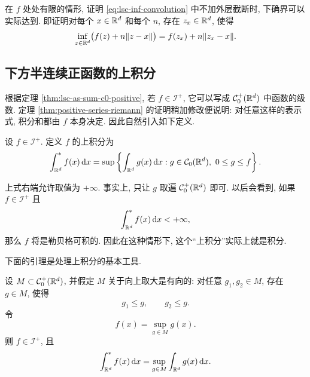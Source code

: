 \begin{exer}
	在 \(f\) 处处有限的情形, 证明 \eqref{eq:lsc-inf-convolution} 中不加外层截断时, 下确界可以实际达到. 即证明对每个 \(x\in\mathbb{R}^d\) 和每个 \(n\), 存在 \(z_x\in\mathbb{R}^d\), 使得
	\[
	\inf_{z\in\mathbb{R}^d}\bigl(f(z)+n\|z-x\|\bigr)
	=f(z_x)+n\|z_x-x\|.
	\]
\end{exer}

\subsection{下方半连续正函数的上积分}

根据定理 \ref{thm:lsc-as-sum-c0-positive}, 若 \(f\in\mathcal I^+\), 它可以写成 \(\mathcal{C}_0^+(\mathbb{R}^d)\) 中函数的级数. 定理 \ref{thm:positive-series-riemann} 的证明稍加修改便说明: 对任意这样的表示式, 积分和都由 \(f\) 本身决定. 因此自然引入如下定义.

\begin{defn}[上积分]
	\label{def:upper-integral-lsc-positive}
	设 \(f\in\mathcal I^+\). 定义 \(f\) 的上积分为
	\begin{equation}
		\int_{\mathbb{R}^d}^{*}f(x)\,\dd x
		=
		\sup\left\{
		\int_{\mathbb{R}^d}g(x)\,\dd x:
		g\in\mathcal{C}_0(\mathbb{R}^d),\ 0\leq g\leq f
		\right\}.
		\label{eq:upper-integral-lsc-positive}
	\end{equation}
\end{defn}

上式右端允许取值为 \(+\infty\). 事实上, 只让 \(g\) 取遍 \(\mathcal{C}_0^+(\mathbb{R}^d)\) 即可. 以后会看到, 如果 \(f\in\mathcal I^+\) 且
\[
\int_{\mathbb{R}^d}^{*}f(x)\,\dd x<+\infty,
\]
那么 \(f\) 将是勒贝格可积的. 因此在这种情形下, 这个“上积分”实际上就是积分.

下面的引理是处理上积分的基本工具.

\begin{lem}\label{lem:directed-sup-integral}
	设 \(M\subset \mathcal{C}_0^+(\mathbb{R}^d)\), 并假定 \(M\) 关于向上取大是有向的: 对任意 \(g_1,g_2\in M\), 存在 \(g\in M\), 使得
	\[
	g_1\leq g,
	\qquad
	g_2\leq g.
	\]
	令
	\[
	f(x)=\sup_{g\in M}g(x).
	\]
	则 \(f\in\mathcal I^+\), 且
	\begin{equation}
		\int_{\mathbb{R}^d}^{*}f(x)\,\dd x
		=
		\sup_{g\in M}\int_{\mathbb{R}^d}g(x)\,\dd x.
		\label{eq:directed-sup-integral}
	\end{equation}
\end{lem}

